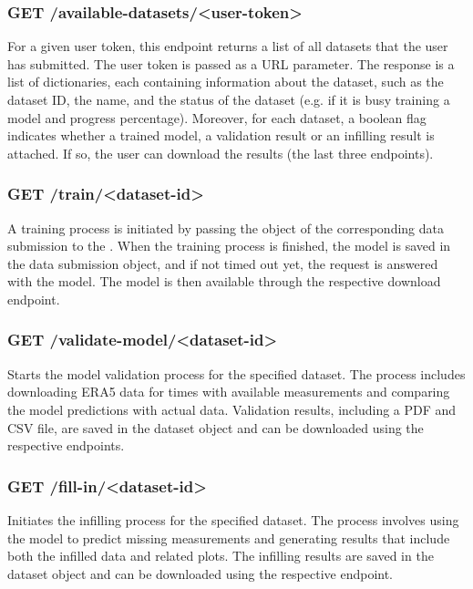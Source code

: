 \subsubsection*{GET /available-datasets/<user-token>}

For a given user token, this endpoint returns a list of all datasets that the user has submitted.
The user token is passed as a URL parameter.
The response is a list of dictionaries, each containing information about the dataset, such as the dataset ID, the name, and the status of the dataset (e.g. if it is busy training a model and progress percentage).
Moreover, for each dataset, a boolean flag indicates whether a trained model, a validation result or an infilling result is attached. If so, the user can download the results (the last three endpoints).

\subsubsection*{GET /train/<dataset-id>}

A training process is initiated by passing the  object of the corresponding data submission to the .
When the training process is finished, the model is saved in the data submission object, and if not timed out yet, the request is answered with the model.
The model is then available through the respective download endpoint.

\subsubsection*{GET /validate-model/<dataset-id>}

Starts the model validation process for the specified dataset.
The process includes downloading ERA5 data for times with available measurements and comparing the model predictions with actual data.
Validation results, including a PDF and CSV file, are saved in the dataset object and can be downloaded using the respective endpoints.

\subsubsection*{GET /fill-in/<dataset-id>}

Initiates the infilling process for the specified dataset.
The process involves using the model to predict missing measurements and generating results that include both the infilled data and related plots.
The infilling results are saved in the dataset object and can be downloaded using the respective endpoint.

